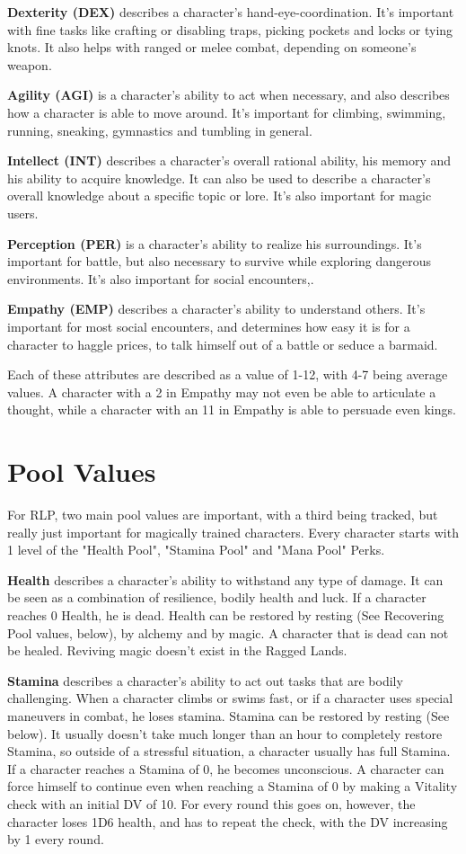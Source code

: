 \textbf{Dexterity (DEX)} describes a character’s hand-eye-coordination. It’s important with fine tasks like crafting or disabling traps, picking pockets and locks or tying knots. It also helps with ranged or melee combat, depending on someone’s weapon.


\textbf{Agility (AGI)} is a character’s ability to act when necessary, and also describes how a character is able to move around. It’s important for climbing, swimming, running, sneaking, gymnastics and tumbling in general.


\textbf{Intellect (INT)} describes a character’s overall rational ability, his memory and his ability to acquire knowledge. It can also be used to describe a character’s overall knowledge about a specific topic or lore. It’s also important for magic users.


\textbf{Perception (PER)} is a character’s ability to realize his surroundings. It’s important for battle, but also necessary to survive while exploring dangerous environments. It’s also important for social encounters,.


\textbf{Empathy (EMP)} describes a character’s ability to understand others. It’s important for most social encounters, and determines how easy it is for a character to haggle prices, to talk himself out of a battle or seduce a barmaid.


Each of these attributes are described as a value of 1-12, with 4-7 being average values. A character with a 2 in Empathy may not even be able to articulate a thought, while a character with an 11 in Empathy is able to persuade even kings.

\section{Pool Values}
For RLP, two main pool values are important, with a third being tracked, but really just important for magically trained characters. Every character starts with 1 level of the "Health Pool", "Stamina Pool" and "Mana Pool" Perks.


\textbf{Health} describes a character’s ability to withstand any type of damage. It can be seen as a combination of resilience, bodily health and luck. If a character reaches 0 Health, he is dead. Health can be restored by resting (See Recovering Pool values, below), by alchemy and by magic. A character that is dead can not be healed. Reviving magic doesn’t exist in the Ragged Lands.


\textbf{Stamina} describes a character’s ability to act out tasks that are bodily challenging. When a character climbs or swims fast, or if a character uses special maneuvers in combat, he loses stamina. Stamina can be restored by resting (See below). It usually doesn’t take much longer than an hour to completely restore Stamina, so outside of a stressful situation, a character usually has full Stamina. If a character reaches a Stamina of 0, he becomes unconscious. A character can force himself to continue even when reaching a Stamina of 0 by making a Vitality check with an initial DV of 10. For every round this goes on, however, the character loses 1D6 health, and has to repeat the check, with the DV increasing by 1 every round.


